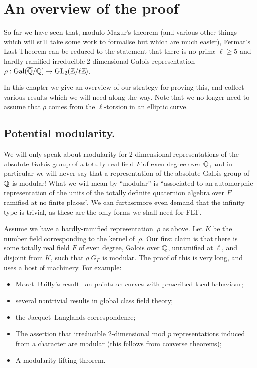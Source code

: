 \chapter{An overview of the proof}\label{ch_overview}

So far we have seen that, modulo Mazur's theorem (and various other things which will still take some work to formalise but which are much easier), Fermat's Last Theorem can be reduced
to the statement that there is no prime $\ell\geq 5$ and hardly-ramified
irreducible 2-dimensional Galois representation $\rho:\operatorname{Gal}(\overline{\mathbb{Q}}/\mathbb{Q})\to\operatorname{GL}_2(\mathbb{Z}/\ell\mathbb{Z})$.

In this chapter we give an overview of our strategy for proving this, and collect
various results which we will need along the way. Note that we no longer need to assume that $\rho$ comes from the $\ell$-torsion in an elliptic curve.

\section{Potential modularity.}

We will only speak about modularity for 2-dimensional representations of the
absolute Galois group of a totally real field $F$ of even degree over $\mathbb{Q}$, and in particular we will
never say that a representation of the absolute Galois group of $\mathbb{Q}$ is modular! What we will
mean by ``modular'' is ``associated to an automorphic representation of the
units of the totally definite quaternion algebra over $F$ ramified at no finite places''.
We can furthermore even demand that the infinity type is trivial, as these are the only
forms we shall need for FLT.

Assume we have a hardly-ramified representation~$\rho$ as above. Let $K$
be the number field corresponding to the kernel of~$\rho$. Our first claim
is that there is some totally real field $F$ of even degree, Galois over $\mathbb{Q}$,
unramified at $\ell$, and disjoint from $K$, such that $\rho|G_F$ is modular. 
The proof of this is very long, and uses a host of machinery. For example:
\begin{itemize}
    \item Moret--Bailly's result~\cite{moret-bailly} on points on curves with prescribed 
    local behaviour;
    \item several nontrivial results in global class field theory;
    \item the Jacquet--Langlands correspondence;
    \item The assertion that irreducible 2-dimensional mod $p$ representations induced from a character are modular (this follows from converse theorems);
    \item A modularity lifting theorem.
\end{itemize}

